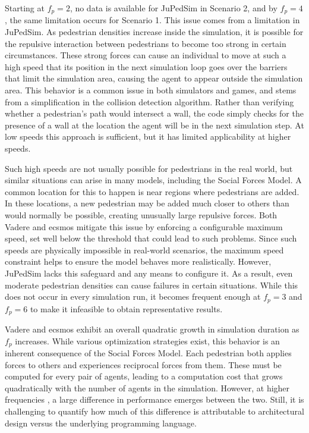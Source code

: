 \documentclass[twoside, 11pt]{article}
\begin{document}
Starting at $f_p = 2$, no data is available for JuPedSim in Scenario 2, and by $f_p = 4$, the same limitation occurs for Scenario 1. This issue comes from a limitation in JuPedSim. As pedestrian densities increase inside the simulation, it is possible for the repulsive interaction between pedestrians to become too strong in certain circumstances. These strong forces can cause an individual to move at such a high speed that its position in the next simulation loop goes over the barriers that limit the simulation area, causing the agent to appear outside the simulation area. This behavior is a common issue in both simulators and games, and stems from a simplification in the collision detection algorithm. Rather than verifying whether a pedestrian's path would intersect a wall, the code simply checks for the presence of a wall at the location the agent will be in the next simulation step. At low speeds this approach is sufficient, but it has limited applicability at higher speeds.

Such high speeds are not usually possible for pedestrians in the real world, but similar situations can arise in many models, including the Social Forces Model. A common location for this to happen is near regions where pedestrians are added. In these locations, a new pedestrian may be added much closer to others than would normally be possible, creating unusually large repulsive forces. Both Vadere and \gls{ecsmos} mitigate this issue by enforcing a configurable maximum speed, set well below the threshold that could lead to such problems. Since such speeds are physically impossible in real-world scenarios, the maximum speed constraint helps to ensure the model behaves more realistically. However, JuPedSim lacks this safeguard and any means to configure it. As a result, even moderate pedestrian densities can cause failures in certain situations. While this does not occur in every simulation run, it becomes frequent enough at $f_p = 3$ and $f_p = 6$ to make it infeasible to obtain representative results.

Vadere and \gls{ecsmos} exhibit an overall quadratic growth in simulation duration as $f_p$ increases. While various optimization strategies exist, this behavior is an inherent consequence of the Social Forces Model. Each pedestrian both applies forces to others and experiences reciprocal forces from them. These must be computed for every pair of agents, leading to a computation cost that grows quadratically with the number of agents in the simulation. However, at higher frequencies , a large difference in performance emerges between the two. Still, it is challenging to quantify how much of this difference is attributable to architectural design versus the underlying programming language.
\end{document}
